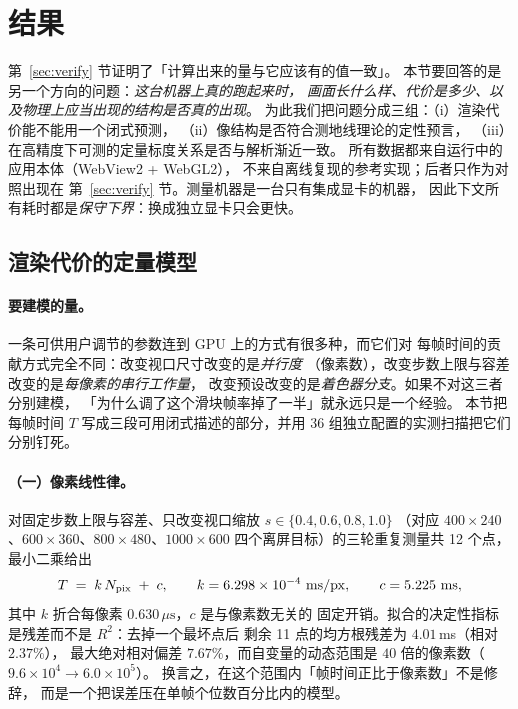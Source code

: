 \section{结果}\label{sec:results}

第~\ref{sec:verify} 节证明了「计算出来的量与它应该有的值一致」。
本节要回答的是另一个方向的问题：\emph{这台机器上真的跑起来时，
画面长什么样、代价是多少、以及物理上应当出现的结构是否真的出现}。
为此我们把问题分成三组：（i）渲染代价能不能用一个闭式预测，
（ii）像结构是否符合测地线理论的定性预言，
（iii）在高精度下可测的定量标度关系是否与解析渐近一致。
所有数据都来自运行中的应用本体（WebView2 + WebGL2），
不来自离线复现的参考实现；后者只作为对照出现在
第~\ref{sec:verify} 节。测量机器是一台只有集成显卡的机器，
因此下文所有耗时都是\emph{保守下界}：换成独立显卡只会更快。

\subsection{渲染代价的定量模型}\label{sec:perf}

\paragraph{要建模的量。}
一条可供用户调节的参数连到 GPU 上的方式有很多种，而它们对
每帧时间的贡献方式完全不同：改变视口尺寸改变的是\emph{并行度}
（像素数），改变步数上限与容差改变的是\emph{每像素的串行工作量}，
改变预设改变的是\emph{着色器分支}。如果不对这三者分别建模，
「为什么调了这个滑块帧率掉了一半」就永远只是一个经验。
本节把每帧时间 $T$ 写成三段可用闭式描述的部分，并用
36 组独立配置的实测扫描把它们分别钉死。

\paragraph{（一）像素线性律。}
对固定步数上限与容差、只改变视口缩放 $s\in\{0.4,0.6,0.8,1.0\}$
（对应 $400\times240$、$600\times360$、$800\times480$、$1000\times600$
四个离屏目标）的三轮重复测量共 12 个点，最小二乘给出
\begin{equation}\label{eq:costpix}
  T \;=\; k\,N_{\rm pix} \;+\; c,\qquad
  k = 6.298\times10^{-4}\ \mathrm{ms/px},\qquad
  c = 5.225\ \mathrm{ms},
\end{equation}
其中 $k$ 折合每像素 $0.630\,\mu\mathrm{s}$，$c$ 是与像素数无关的
固定开销。拟合的决定性指标是残差而不是 $R^2$：去掉一个最坏点后
剩余 11 点的均方根残差为 $4.01$\,ms（相对 $2.37\%$），
最大绝对相对偏差 $7.67\%$，而自变量的动态范围是
$40$ 倍的像素数（$9.6\times10^4\to6.0\times10^5$）。
换言之，在这个范围内「帧时间正比于像素数」不是修辞，
而是一个把误差压在单帧个位数百分比内的模型。

